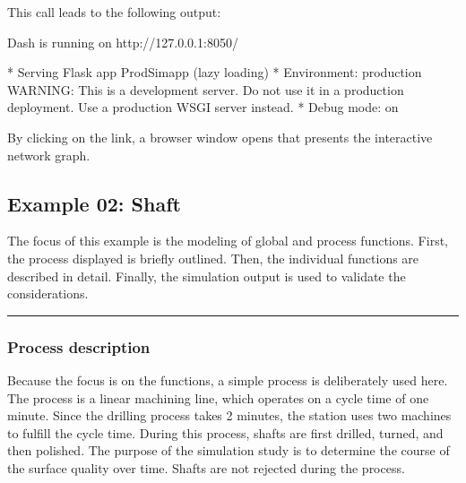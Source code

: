 \documentclass[letterpaper,10pt,english]{sphinxmanual}
\begin{document}
\begin{sphinxVerbatim}[commandchars=\\\{\}]
\end{sphinxVerbatim}

\sphinxAtStartPar
This call leads to the following output:

\begin{sphinxVerbatim}[commandchars=\\\{\}]
Dash is running on http://127.0.0.1:8050/

 * Serving Flask app \PYGZsq{}ProdSim\PYGZus{}app\PYGZsq{} (lazy loading)
 * Environment: production
   WARNING: This is a development server. Do not use it in a production deployment.
   Use a production WSGI server instead.
 * Debug mode: on
\end{sphinxVerbatim}

\sphinxAtStartPar
By clicking on the link, a browser window opens that presents the interactive network graph.



\subsection{Example 02: Shaft}
\label{\detokenize{source/Examples/example02:example-02-shaft}}\label{\detokenize{source/Examples/example02:id1}}\label{\detokenize{source/Examples/example02::doc}}
\sphinxAtStartPar
The focus of this example is the modeling of global and process functions. First, the process displayed is briefly
outlined. Then, the individual functions are described in detail. Finally, the simulation output is used to validate the
considerations.


\bigskip\hrule\bigskip



\subsubsection{Process description}
\label{\detokenize{source/Examples/example02:process-description}}\label{\detokenize{source/Examples/example02:id2}}
\sphinxAtStartPar
Because the focus is on the functions, a simple process is deliberately used here. The process is a linear machining
line, which operates on a cycle time of one minute. Since the drilling process takes 2 minutes, the station uses two
machines to fulfill the cycle time. During this process, shafts are first drilled, turned, and then polished. The
purpose of the simulation study is to determine the course of the surface quality over time. Shafts are not rejected
during the process.
\end{document}
